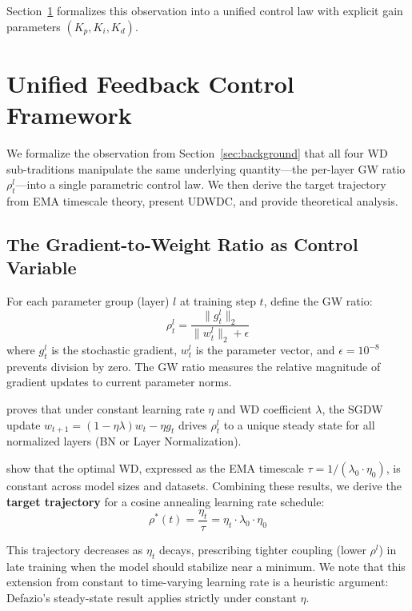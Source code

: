 \documentclass{article}
\begin{document}
Section~\ref{sec:framework} formalizes this observation into a unified control law with explicit gain parameters $(K_p, K_i, K_d)$.

\section{Unified Feedback Control Framework}
\label{sec:framework}

We formalize the observation from Section~\ref{sec:background} that all four WD sub-traditions manipulate the same underlying quantity---the per-layer GW ratio $\rho_t^l$---into a single parametric control law. We then derive the target trajectory from EMA timescale theory, present UDWDC, and provide theoretical analysis.

\subsection{The Gradient-to-Weight Ratio as Control Variable}

For each parameter group (layer) $l$ at training step $t$, define the GW ratio:
\begin{equation}
\rho_t^l = \frac{\|g_t^l\|_2}{\|w_t^l\|_2 + \epsilon}
\label{eq:gw_ratio}
\end{equation}
where $g_t^l$ is the stochastic gradient, $w_t^l$ is the parameter vector, and $\epsilon = 10^{-8}$ prevents division by zero. The GW ratio measures the relative magnitude of gradient updates to current parameter norms.

\citet{defazio2025gw} proves that under constant learning rate $\eta$ and WD coefficient $\lambda$, the SGDW update $w_{t+1} = (1 - \eta\lambda)w_t - \eta g_t$ drives $\rho_t^l$ to a unique steady state for all normalized layers (BN or Layer Normalization).

\citet{wang2025ema} show that the optimal WD, expressed as the EMA timescale $\tau = 1/(\lambda_0 \cdot \eta_0)$, is constant across model sizes and datasets. Combining these results, we derive the \textbf{target trajectory} for a cosine annealing learning rate schedule:
\begin{equation}
\rho^*(t) = \frac{\eta_t}{\tau} = \eta_t \cdot \lambda_0 \cdot \eta_0
\label{eq:target}
\end{equation}

This trajectory decreases as $\eta_t$ decays, prescribing tighter coupling (lower $\rho^l$) in late training when the model should stabilize near a minimum. We note that this extension from constant to time-varying learning rate is a heuristic argument: Defazio's steady-state result applies strictly under constant $\eta$.
\end{document}
